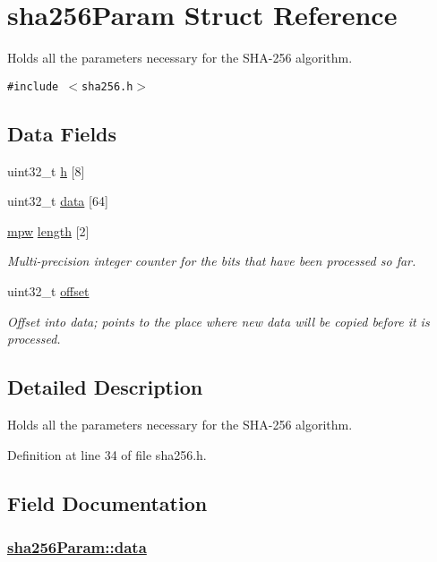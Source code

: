 \hypertarget{structsha256Param}{
\section{sha256Param Struct Reference}
\label{structsha256Param}
}
Holds all the parameters necessary for the SHA-256 algorithm.  


{\tt \#include $<$sha256.h$>$}

\subsection*{Data Fields}
\begin{CompactItemize}
\item 
uint32\_\-t \hyperlink{structsha256Param_o0}{h} \mbox{[}8\mbox{]}
\item 
uint32\_\-t \hyperlink{structsha256Param_o1}{data} \mbox{[}64\mbox{]}
\item 
\hyperlink{beecrypt_8api_8h_a9}{mpw} \hyperlink{structsha256Param_o2}{length} \mbox{[}2\mbox{]}
\begin{CompactList}\small\item\em Multi-precision integer counter for the bits that have been processed so far. \item\end{CompactList}\item 
uint32\_\-t \hyperlink{structsha256Param_o3}{offset}
\begin{CompactList}\small\item\em Offset into {\em data\/}; points to the place where new data will be copied before it is processed. \item\end{CompactList}\end{CompactItemize}


\subsection{Detailed Description}
Holds all the parameters necessary for the SHA-256 algorithm. 

Definition at line 34 of file sha256.h.

\subsection{Field Documentation}
\hypertarget{structsha256Param_o1}{
\subsubsection[data]{\setlength{\rightskip}{0pt plus 5cm}\hyperlink{structsha256Param_o1}{sha256Param::data}}}
\label{structsha256Param_o1}


